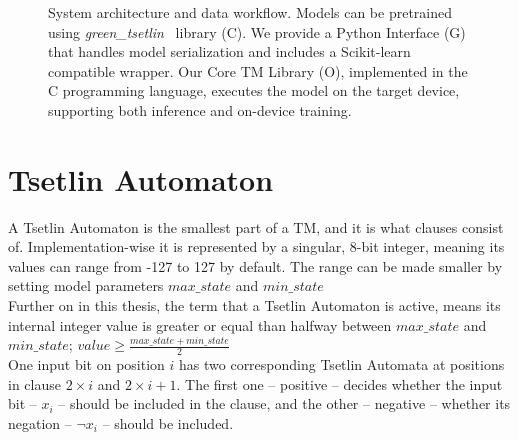 \documentclass[english]{aghengthesis} %
\newcommand*{\GreenTsetlinName}{\emph{green\_tsetlin}~\cite{glimsdal2024greentsetlin} }
\begin{document}
\begin{figure}[!htbp]

\caption[System architecture and data workflow]{System architecture and data workflow. Models can be pretrained using \GreenTsetlinName library (C). We provide a Python Interface (G) that handles model serialization and includes a Scikit-learn compatible wrapper. Our Core TM Library (O), implemented in the C programming language, executes the model on the target device, supporting both inference and on-device training.}
\label{fig:projectdiagram}
\end{figure}

\clearpage
\section{Tsetlin Automaton}
A Tsetlin Automaton is the smallest part of a TM, and it is what clauses consist of. Implementation-wise it is represented by a singular, 8-bit integer, meaning its values can range from -127 to 127 by default. The range can be made smaller by setting model parameters $max\_state$ and $min\_state$ \\
Further on in this thesis, the term that a Tsetlin Automaton is active, means its internal integer value is greater or equal than halfway between $max\_state$ and $min\_state$; $value \ge \frac{max\_state + min\_state}{2}$  \\
One input bit on position $i$ has two corresponding Tsetlin Automata at positions in clause $2 \times i$ and $2 \times i + 1$. The first one -- positive -- decides whether the input bit -- $x_i$ -- should be included in the clause, and the other -- negative -- whether its negation -- $\neg x_i$ -- should be included.
\end{document}
